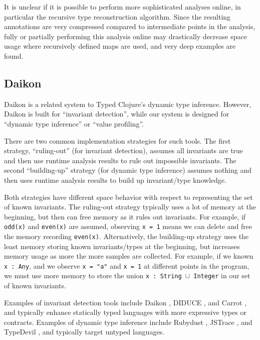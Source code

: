 It is unclear if it is possible to perform more sophisticated analyses online,
in particular the recursive type reconstruction algorithm. Since the resulting
annotations are very compressed compared to intermediate points in the analysis,
fully or partially performing this analysis online may drastically decrease space
usage where recursively defined maps are used, and very deep examples are found.

\subsection{Daikon}

Daikon is a related system to Typed Clojure's dynamic type inference.
However, Daikon is built for ``invariant detection'', while our system
is designed for ``dynamic type inference'' or ``value profiling''.

There are two common implementation strategies for such tools. The first
strategy, ``ruling-out'' (for invariant detection), assumes all invariants are true 
and then use runtime analysis results to rule out
impossible invariants. The second ``building-up'' strategy (for dynamic type inference)
assumes nothing and then uses runtime analysis results to build up invariant/type knowledge.

Both strategies have different space behavior with respect to representing
the set of known invariants.
The ruling-out strategy typically uses a lot of memory at the beginning,
but then can free memory as it rules out invariants. For example, if
\texttt{odd(x)} and \texttt{even(x)} are assumed, observing \texttt{x = 1}
means we can delete and free the memory recording \texttt{even(x)}.
Alternatively, the building-up strategy uses the least memory storing
known invariants/types at the beginning, but increases memory usage
as more the more samples are collected. For example, if we known
\texttt{x : Any}, and we observe \texttt{x = "a"} and \texttt{x = 1}
at different points in the program, we must use more memory to
store the union \texttt{x : String $\cup$ Integer} in our set of known invariants.

Examples of invariant detection tools include Daikon \cite{Ernst06thedaikon},
DIDUCE \cite{hangal2002tracking}, and Carrot \cite{pytlik2003automated}, and
typically enhance statically typed languages with more expressive types or contracts.
Examples of dynamic type inference include Rubydust \cite{An10dynamicinference},
JSTrace \cite{saftoiu2010jstrace}, and TypeDevil \cite{pradel2015typedevil},
and typically target untyped languages.

